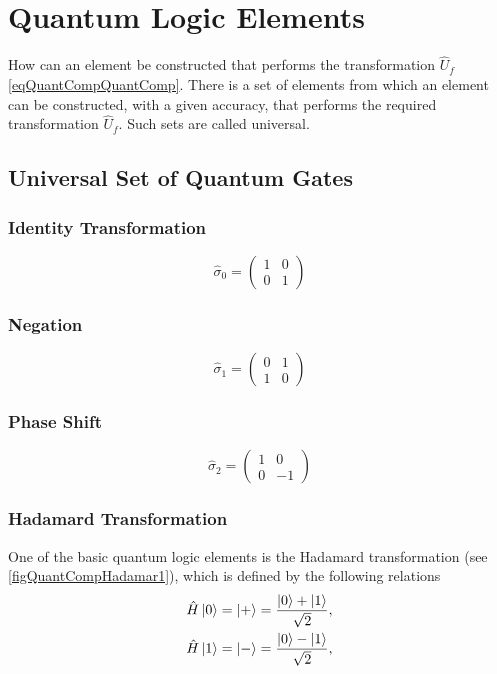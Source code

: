 \section{Quantum Logic Elements}
How can an element be constructed that performs the transformation $\hat{U}_f$ \eqref{eqQuantCompQuantComp}. There is a set of elements from which an element can be constructed, with a given accuracy, that performs the required transformation $\hat{U}_f$. Such sets are called universal.

\subsection{Universal Set of Quantum Gates}

\subsubsection{Identity Transformation}

\[
\hat{\sigma}_0 = \begin{pmatrix}
1 & 0 \\
0 & 1
\end{pmatrix}
\]

\subsubsection{Negation}

\[
\hat{\sigma}_1 = \begin{pmatrix}
0 & 1 \\
1 & 0
\end{pmatrix}
\]

\subsubsection{Phase Shift}

\[
\hat{\sigma}_2 = \begin{pmatrix}
1 & 0 \\
0 & -1
\end{pmatrix}
\]

\subsubsection{Hadamard Transformation}
One of the basic quantum logic elements is the Hadamard transformation (see \autoref{figQuantCompHadamar1}), which is defined by the following relations
\begin{eqnarray}
\hat{H} \ket{0} = \ket{+} =  
\frac{\ket{0} + \ket{1} }{\sqrt{2}},
\nonumber \\
\hat{H} \ket{1} = \ket{-} = 
\frac{\ket{0} - \ket{1} }{\sqrt{2}},
\nonumber
\end{eqnarray}

